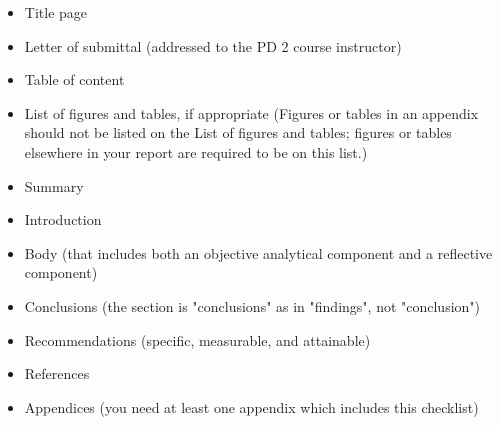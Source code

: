 \documentclass[12pt]{report}
\begin{document}
\begin{itemize}[label={•	[T] }]
    \item{Title page}
    \item{Letter of submittal (addressed to the PD 2 course instructor) }
    \item{Table of content}
    \item{List of figures and tables, if appropriate (Figures or tables in an appendix should not be listed on the List of figures and tables; figures or tables elsewhere in your report are required to be on this list.) }
    \item{Summary }
    \item{Introduction}
    \item{Body (that includes both an objective analytical component and a reflective component) }
    \item{Conclusions (the section is "conclusions" as in "findings", not "conclusion") }
    \item{Recommendations (specific, measurable, and attainable) }
    \item{References }
    \item{Appendices (you need at least one appendix which includes this checklist) }
\end{itemize}
\end{document}
